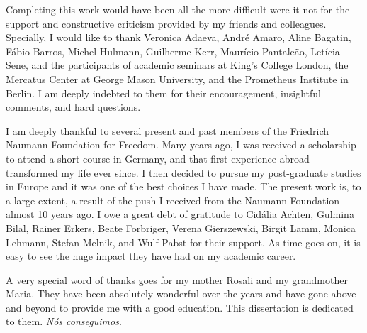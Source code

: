 \documentclass[a4paper,12pt]{report}
\begin{document}
Completing this work would have been all the more difficult were it not for the support and constructive criticism provided by my friends and colleagues. Specially, I would like to thank Veronica Adaeva, André Amaro, Aline Bagatin, Fábio Barros, Michel Hulmann, Guilherme Kerr, Maurício Pantaleão, Letícia Sene, and the participants of academic seminars at King's College London, the Mercatus Center at George Mason University, and the Prometheus Institute in Berlin. I am deeply indebted to them for their encouragement, insightful comments, and hard questions.

I am deeply thankful to several present and past members of the Friedrich Naumann Foundation for Freedom. Many years ago, I was received a scholarship to attend a short course in Germany, and that first experience abroad transformed my life ever since. I then decided to pursue my post-graduate studies in Europe and it was one of the best choices I have made. The present work is, to a large extent, a result of the push I received from the Naumann Foundation almost 10 years ago. I owe a great debt of gratitude to Cidália Achten, Gulmina Bilal, Rainer Erkers, Beate Forbriger, Verena Gierszewski, Birgit Lamm, Monica Lehmann, Stefan Melnik, and Wulf Pabst for their support. As time goes on, it is easy to see the huge impact they have had on my academic career.

A very special word of thanks goes for my mother Rosali and my grandmother Maria. They have been absolutely wonderful over the years and have gone above and beyond to provide me with a good education. This dissertation is dedicated to them. \textit{Nós conseguimos}. 


\newpage
{}
\tableofcontents
\listoftables
{}
{}
\listoffigures
{}
{}

\newpage
{}




\end{document}
